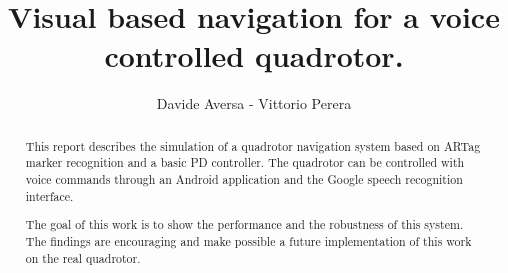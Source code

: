 \documentclass[a4paper,10pt]{article}
\title{Visual based navigation for a voice controlled quadrotor.}
\author{Davide Aversa - Vittorio Perera}
\begin{document}
\maketitle

\begin{abstract}

This report describes the simulation of a quadrotor navigation system based on
ARTag marker recognition and a basic PD controller. The quadrotor can be
controlled with voice commands through an Android application and the Google
speech recognition interface.

The goal of this work is to show the performance and the robustness of this
system. The findings are encouraging and make possible a future implementation
of this work on the real quadrotor.

\end{abstract}











%




\end{document}
